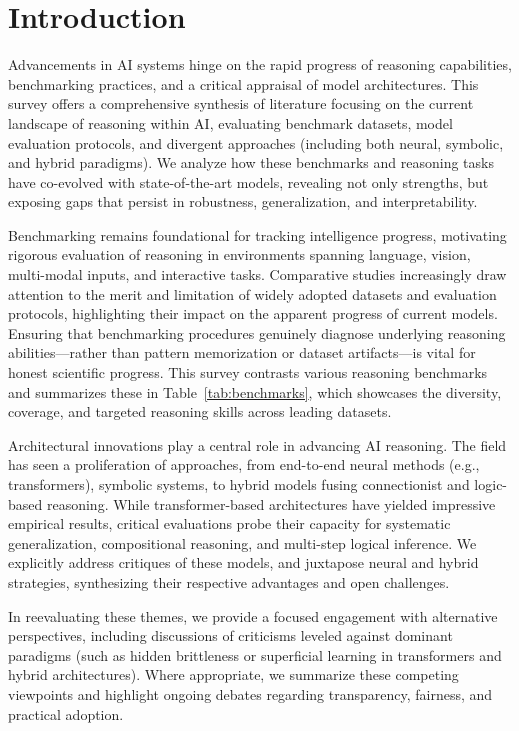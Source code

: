\documentclass[sigconf]{acmart}
\begin{document}
\section{Introduction}

Advancements in AI systems hinge on the rapid progress of reasoning capabilities, benchmarking practices, and a critical appraisal of model architectures. This survey offers a comprehensive synthesis of literature focusing on the current landscape of reasoning within AI, evaluating benchmark datasets, model evaluation protocols, and divergent approaches (including both neural, symbolic, and hybrid paradigms). We analyze how these benchmarks and reasoning tasks have co-evolved with state-of-the-art models, revealing not only strengths, but exposing gaps that persist in robustness, generalization, and interpretability.

Benchmarking remains foundational for tracking intelligence progress, motivating rigorous evaluation of reasoning in environments spanning language, vision, multi-modal inputs, and interactive tasks. Comparative studies increasingly draw attention to the merit and limitation of widely adopted datasets and evaluation protocols, highlighting their impact on the apparent progress of current models. Ensuring that benchmarking procedures genuinely diagnose underlying reasoning abilities---rather than pattern memorization or dataset artifacts---is vital for honest scientific progress. This survey contrasts various reasoning benchmarks and summarizes these in Table~\ref{tab:benchmarks}, which showcases the diversity, coverage, and targeted reasoning skills across leading datasets.

Architectural innovations play a central role in advancing AI reasoning. The field has seen a proliferation of approaches, from end-to-end neural methods (e.g., transformers), symbolic systems, to hybrid models fusing connectionist and logic-based reasoning. While transformer-based architectures have yielded impressive empirical results, critical evaluations probe their capacity for systematic generalization, compositional reasoning, and multi-step logical inference. We explicitly address critiques of these models, and juxtapose neural and hybrid strategies, synthesizing their respective advantages and open challenges.

In reevaluating these themes, we provide a focused engagement with alternative perspectives, including discussions of criticisms leveled against dominant paradigms (such as hidden brittleness or superficial learning in transformers and hybrid architectures). Where appropriate, we summarize these competing viewpoints and highlight ongoing debates regarding transparency, fairness, and practical adoption.
\end{document}

